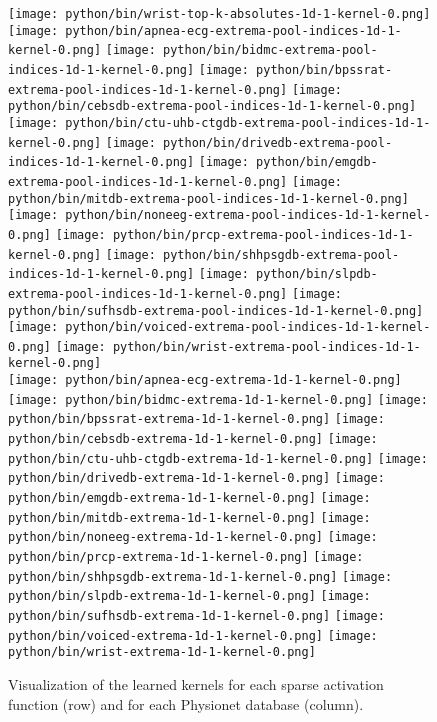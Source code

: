 \documentclass[journal]{IEEEtran}
\begin{document}
\begin{figure*}[!t]
	\texttt{[image: python/bin/wrist-top-k-absolutes-1d-1-kernel-0.png]}
	\\
	\texttt{[image: python/bin/apnea-ecg-extrema-pool-indices-1d-1-kernel-0.png]}
	\texttt{[image: python/bin/bidmc-extrema-pool-indices-1d-1-kernel-0.png]}
	\texttt{[image: python/bin/bpssrat-extrema-pool-indices-1d-1-kernel-0.png]}
	\texttt{[image: python/bin/cebsdb-extrema-pool-indices-1d-1-kernel-0.png]}
	\texttt{[image: python/bin/ctu-uhb-ctgdb-extrema-pool-indices-1d-1-kernel-0.png]}
	\texttt{[image: python/bin/drivedb-extrema-pool-indices-1d-1-kernel-0.png]}
	\texttt{[image: python/bin/emgdb-extrema-pool-indices-1d-1-kernel-0.png]}
	\texttt{[image: python/bin/mitdb-extrema-pool-indices-1d-1-kernel-0.png]}
	\texttt{[image: python/bin/noneeg-extrema-pool-indices-1d-1-kernel-0.png]}
	\texttt{[image: python/bin/prcp-extrema-pool-indices-1d-1-kernel-0.png]}
	\texttt{[image: python/bin/shhpsgdb-extrema-pool-indices-1d-1-kernel-0.png]}
	\texttt{[image: python/bin/slpdb-extrema-pool-indices-1d-1-kernel-0.png]}
	\texttt{[image: python/bin/sufhsdb-extrema-pool-indices-1d-1-kernel-0.png]}
	\texttt{[image: python/bin/voiced-extrema-pool-indices-1d-1-kernel-0.png]}
	\texttt{[image: python/bin/wrist-extrema-pool-indices-1d-1-kernel-0.png]}
	\\
	\texttt{[image: python/bin/apnea-ecg-extrema-1d-1-kernel-0.png]}
	\texttt{[image: python/bin/bidmc-extrema-1d-1-kernel-0.png]}
	\texttt{[image: python/bin/bpssrat-extrema-1d-1-kernel-0.png]}
	\texttt{[image: python/bin/cebsdb-extrema-1d-1-kernel-0.png]}
	\texttt{[image: python/bin/ctu-uhb-ctgdb-extrema-1d-1-kernel-0.png]}
	\texttt{[image: python/bin/drivedb-extrema-1d-1-kernel-0.png]}
	\texttt{[image: python/bin/emgdb-extrema-1d-1-kernel-0.png]}
	\texttt{[image: python/bin/mitdb-extrema-1d-1-kernel-0.png]}
	\texttt{[image: python/bin/noneeg-extrema-1d-1-kernel-0.png]}
	\texttt{[image: python/bin/prcp-extrema-1d-1-kernel-0.png]}
	\texttt{[image: python/bin/shhpsgdb-extrema-1d-1-kernel-0.png]}
	\texttt{[image: python/bin/slpdb-extrema-1d-1-kernel-0.png]}
	\texttt{[image: python/bin/sufhsdb-extrema-1d-1-kernel-0.png]}
	\texttt{[image: python/bin/voiced-extrema-1d-1-kernel-0.png]}
	\texttt{[image: python/bin/wrist-extrema-1d-1-kernel-0.png]}
	\caption{Visualization of the learned kernels for each sparse activation function (row) and for each Physionet database (column).
	}\label{fig:kernelvisualization}
\end{figure*}
\end{document}
